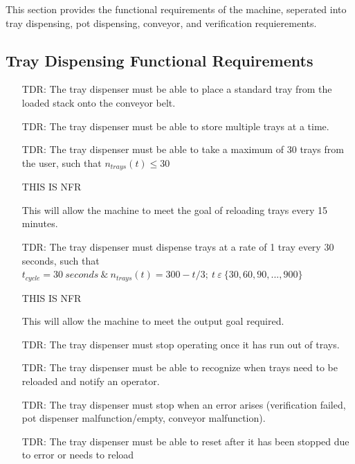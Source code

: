 \documentclass[12pt]{article}
\newcounter{tdreqnum} %
\begin{document}
This section provides the functional requirements of the machine, seperated into tray dispensing,
pot dispensing, conveyor, and verification requierements.
\varGamma 

\subsection{Tray Dispensing Functional Requirements}

\noindent \begin{itemize}

\item[TDR\refstepcounter{tdreqnum}\thetdreqnum \label{R_Tray}:] {The tray dispenser must
    be able to place a standard tray from the loaded stack onto the conveyor belt.}

\item[TDR\refstepcounter{tdreqnum}\thetdreqnum \label{R_Tray}:] {The tray dispenser must
      be able to store multiple trays at a time.}

\item[TDR\refstepcounter{tdreqnum}\thetdreqnum \label{R_Tray}:] {The tray dispenser must 
    be able to take a maximum of 30 trays from the user, such that 
    $n_{trays}(t)\le30$} 
    
    THIS IS NFR

This will allow the machine to meet the goal of reloading trays every 15 minutes.

\item[TDR\refstepcounter{tdreqnum}\thetdreqnum \label{R_Tray}:] {The tray dispenser must
    dispense trays at a rate of 1 tray every 30 seconds, such that $t_{cycle}=30\ seconds
    \ \&\ n_{trays}\left(t\right)=300-t/3;\ t\ \varepsilon\ \{30, 60, 90, ..., 900\}$}

    THIS IS NFR

This will allow the machine to meet the output goal required.

\item[TDR\refstepcounter{tdreqnum}\thetdreqnum \label{R_Tray}:] {The tray dispenser must
    stop operating once it has run out of trays.}

\item[TDR\refstepcounter{tdreqnum}\thetdreqnum \label{R_Tray}:] {The tray dispenser must
    be able to recognize when trays need to be reloaded and notify an operator.}

\item[TDR\refstepcounter{tdreqnum}\thetdreqnum \label{R_Tray}:] {The tray dispenser must
     stop when an error arises (verification failed, pot dispenser malfunction/empty, conveyor
     malfunction).}

\item[TDR\refstepcounter{tdreqnum}\thetdreqnum \label{R_Tray}:] {The tray dispenser must
    be able to reset after it has been stopped due to error or needs to reload}


\end{itemize}
\end{document}
